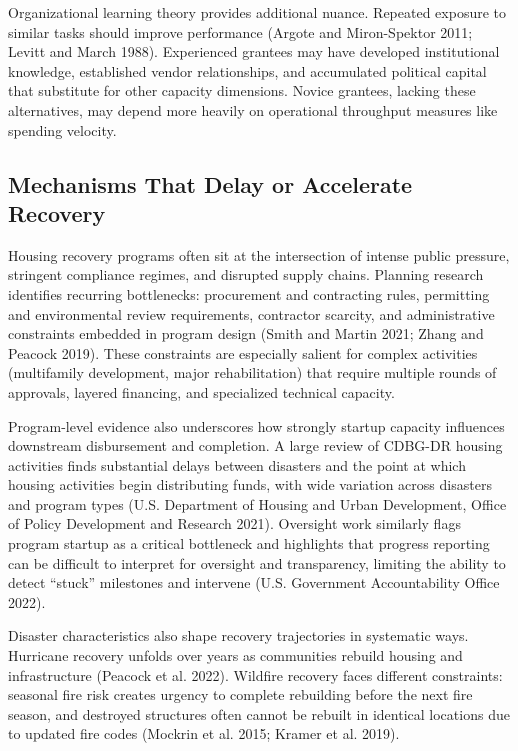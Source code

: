 \documentclass[
  12pt,
  letterpaper,
]{article}
\begin{document}
Organizational learning theory provides additional nuance. Repeated
exposure to similar tasks should improve performance (Argote and
Miron-Spektor 2011; Levitt and March 1988). Experienced grantees may
have developed institutional knowledge, established vendor
relationships, and accumulated political capital that substitute for
other capacity dimensions. Novice grantees, lacking these alternatives,
may depend more heavily on operational throughput measures like spending
velocity.

\subsection{Mechanisms That Delay or Accelerate
Recovery}\label{mechanisms-that-delay-or-accelerate-recovery}

Housing recovery programs often sit at the intersection of intense
public pressure, stringent compliance regimes, and disrupted supply
chains. Planning research identifies recurring bottlenecks: procurement
and contracting rules, permitting and environmental review requirements,
contractor scarcity, and administrative constraints embedded in program
design (Smith and Martin 2021; Zhang and Peacock 2019). These
constraints are especially salient for complex activities (multifamily
development, major rehabilitation) that require multiple rounds of
approvals, layered financing, and specialized technical capacity.

Program-level evidence also underscores how strongly startup capacity
influences downstream disbursement and completion. A large review of
CDBG-DR housing activities finds substantial delays between disasters
and the point at which housing activities begin distributing funds, with
wide variation across disasters and program types (U.S. Department of
Housing and Urban Development, Office of Policy Development and Research
2021). Oversight work similarly flags program startup as a critical
bottleneck and highlights that progress reporting can be difficult to
interpret for oversight and transparency, limiting the ability to detect
``stuck'' milestones and intervene (U.S. Government Accountability
Office 2022).

Disaster characteristics also shape recovery trajectories in systematic
ways. Hurricane recovery unfolds over years as communities rebuild
housing and infrastructure (Peacock et al. 2022). Wildfire recovery
faces different constraints: seasonal fire risk creates urgency to
complete rebuilding before the next fire season, and destroyed
structures often cannot be rebuilt in identical locations due to updated
fire codes (Mockrin et al. 2015; Kramer et al. 2019).
\end{document}
